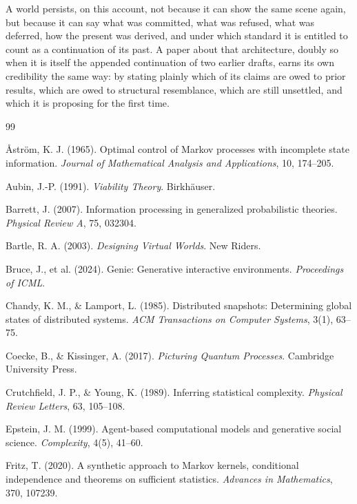 \documentclass[11pt]{article}
\begin{document}
A world persists, on this account, not because it can show the same scene again, but because it can say what was committed, what was refused, what was deferred, how the present was derived, and under which standard it is entitled to count as a continuation of its past. A paper about that architecture, doubly so when it is itself the appended continuation of two earlier drafts, earns its own credibility the same way: by stating plainly which of its claims are owed to prior results, which are owed to structural resemblance, which are still unsettled, and which it is proposing for the first time.

\begin{thebibliography}{99}

 \AA{}str\"om, K. J. (1965). Optimal control of Markov processes with incomplete state information. \textit{Journal of Mathematical Analysis and Applications}, 10, 174--205.

 Aubin, J.-P. (1991). \textit{Viability Theory}. Birkh\"auser.

 Barrett, J. (2007). Information processing in generalized probabilistic theories. \textit{Physical Review A}, 75, 032304.

 Bartle, R. A. (2003). \textit{Designing Virtual Worlds}. New Riders.

 Bruce, J., et al. (2024). Genie: Generative interactive environments. \textit{Proceedings of ICML}.

 Chandy, K. M., \& Lamport, L. (1985). Distributed snapshots: Determining global states of distributed systems. \textit{ACM Transactions on Computer Systems}, 3(1), 63--75.

 Coecke, B., \& Kissinger, A. (2017). \textit{Picturing Quantum Processes}. Cambridge University Press.

 Crutchfield, J. P., \& Young, K. (1989). Inferring statistical complexity. \textit{Physical Review Letters}, 63, 105--108.

 Epstein, J. M. (1999). Agent-based computational models and generative social science. \textit{Complexity}, 4(5), 41--60.

 Fritz, T. (2020). A synthetic approach to Markov kernels, conditional independence and theorems on sufficient statistics. \textit{Advances in Mathematics}, 370, 107239.


\end{thebibliography}
\end{document}
